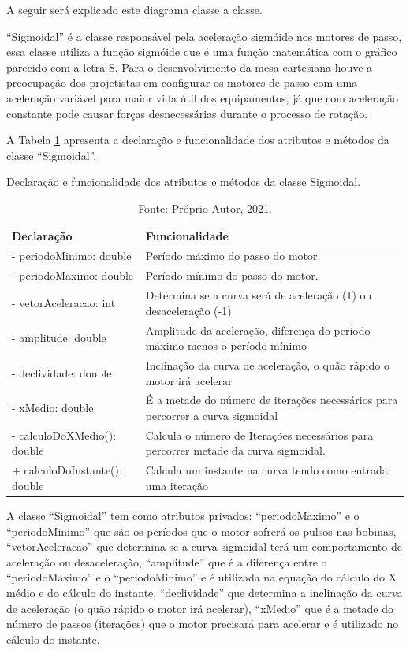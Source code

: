 A seguir será explicado este diagrama classe a classe.

“Sigmoidal” é a classe responsável pela aceleração sigmóide nos motores de passo, essa classe utiliza 
a função sigmóide que é uma função matemática com o gráfico parecido com a letra S. Para o desenvolvimento 
da mesa cartesiana houve a preocupação dos projetistas em configurar os motores de passo com uma aceleração 
variável para maior vida útil dos equipamentos, já que com aceleração constante pode causar forças 
desnecessárias durante o processo de rotação.

A Tabela \ref{tab:classesigmoidal} apresenta a declaração e funcionalidade dos atributos e métodos 
da classe “Sigmoidal”.

\begin{table}[H]
    \centering
    \caption{Declaração e funcionalidade dos atributos e métodos da classe Sigmoidal.}
    \begin{tabular}{lp{9cm}}
        \hline
        \textbf{Declaração} & \textbf{Funcionalidade}\\
        \hline
        - periodoMinimo: double & Período máximo do passo do motor.\\
        - periodoMaximo: double & Período mínimo do passo do motor.\\
        - vetorAceleracao: int & Determina se a curva será de aceleração (1) ou desaceleração (-1)\\
        - amplitude: double & Amplitude da aceleração, diferença do período máximo menos o período mínimo\\
        - declividade: double & Inclinação da curva de aceleração, o quão rápido o motor irá acelerar\\
        - xMedio: double & É a metade do número de iterações necessários para percorrer a curva sigmoidal\\
        - calculoDoXMedio(): double & Calcula o número de Iterações necessários para percorrer metade da curva sigmoidal.\\
        + calculoDoInstante(): double & Calcula um instante na curva tendo como entrada uma iteração\\
        \hline       
    \end{tabular}
    \caption*{Fonte: Próprio Autor, 2021.}
    \label{tab:classesigmoidal}
\end{table}

A classe “Sigmoidal” tem como atributos privados: “periodoMaximo” e o “periodoMinimo” que são os períodos 
que o motor sofrerá os pulsos nas bobinas, “vetorAceleracao” que determina se a curva sigmoidal terá 
um comportamento de aceleração ou desaceleração, “amplitude” que é a diferença entre o “periodoMaximo” 
e o “periodoMinimo” e é utilizada na equação do cálculo do X médio e do cálculo do instante, “declividade” 
que determina a inclinação da curva de aceleração (o quão rápido o motor irá acelerar), “xMedio” que é a 
metade do número de passos (iterações) que o motor precisará para acelerar e é utilizado no cálculo 
do instante. 


